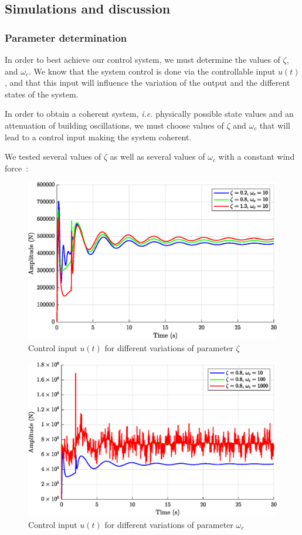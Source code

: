 \subsection{Simulations and discussion}
\subsubsection{Parameter determination}
In order to best achieve our control system, we must determine the values of $\zeta$, and $\omega_c$. We know that the system control is done via the controllable input $u(t)$, and that this input will influence the variation of the output and the different states of the system.\par
In order to obtain a coherent system, {\it i.e.} physically possible state values and an attenuation of building oscillations, we must choose values of $\zeta$ and $\omega_c$ that will lead to a control input making the system coherent.\par
We tested several values of $\zeta$ as well as several values of $\omega_c$ with a constant wind force~:
\begin{figure}[H]
    \centering
    \includegraphics[width=\textwidth]{resources/eps/3_zeta-variations.eps}
    \caption{Control input $u(t)$ for different variations of parameter $\zeta$}
\end{figure}
\begin{figure}[H]
    \centering
    \includegraphics[width=\textwidth]{resources/eps/3_omega-variations.eps}
    \caption{Control input $u(t)$ for different variations of parameter $\omega_c$}
\end{figure}

